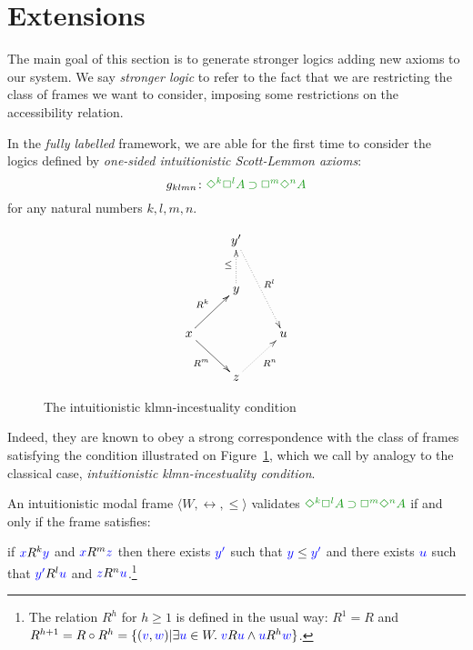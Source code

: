\newcommand{\set}[1]{\{#1\}}

\section{Extensions}\label{sec:ext}

The main goal of this section is to generate stronger logics adding new axioms to our system. We say \emph{stronger logic} to refer to the fact that we are restricting the class of frames we want to consider, imposing some restrictions on the accessibility relation. 

In the \emph{fully labelled} framework, we are able for the first time to consider the logics defined by \emph{one-sided intuitionistic Scott-Lemmon axioms}:
\begin{equation}
\agklmn\colon\fm{\DIA^{k} \BOX^{l} A \IMP \BOX^{m}\DIA^{n} A}
\end{equation}
for any natural numbers $k,l,m,n$.

\begin{figure}
	$$
	\xymatrix{
		& y' \ar@{.>}[ddr]^{R^l} \\
		& y \ar@{.>}[u]^{\le} \\
		x \ar@{->}[ur]^{R^k}\ar@{->}[dr]_{R^m} && u \\
		& z \ar@{.>}[ur]_{R^n}
	}
	$$
	\caption{The intuitionistic klmn-incestuality condition}
	\label{fig:gklmn}
\end{figure}

Indeed, they are known to obey a strong correspondence with the class of frames satisfying the condition illustrated on Figure~\ref{fig:gklmn}, which we call by analogy to the classical case, \emph{intuitionistic klmn-incestuality condition}.

\begin{theorem}\label{thm:gklmn-correspondence}
	An intuitionistic modal frame $\langle W, \rel, \le \rangle$ validates $\fm{\DIA^k\BOX^l A \IMP \BOX^m\DIA^n A}$ if and only if the frame satisfies:
	
	if ${\color{blue}{x}} R^{k} {\color{blue}{y}}$ and ${\color{blue}{x}} R^{m} {\color{blue}{z}}$ then there exists ${\color{blue}{y'}}$ such that ${\color{blue}{y}}\le{{\color{blue}{y'}}}$ and there exists ${\color{blue}{u}}$ such that ${\color{blue}{y'}}R^{l}{\color{blue}{u}}$ and ${\color{blue}{z}} R^{n} {\color{blue}{u}}$.\footnote{The relation $R^h$ for $h\ge1$ is defined in the usual way: $R^1=R$ and $R^{h+1}=R\circ R^h=\set{(\lb v,\lb w)|\exists \lb u\in W.\; \lb vR\lb u \wedge \lb uR^h\lb w}$.}
\end{theorem}

